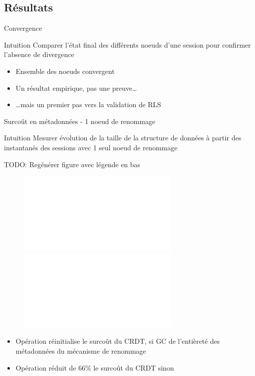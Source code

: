 \subsection{Résultats}

\begin{frame}{Convergence}
  \begin{block}{Intuition}
    Comparer l'état final des différents noeuds d'une session pour confirmer l'absence de divergence
  \end{block}
  \begin{itemize}
    \item Ensemble des noeuds convergent
    \item Un résultat empirique, pas une preuve\dots
    \item \dots mais un premier pas vers la validation de RLS
  \end{itemize}
\end{frame}

\begin{frame}{Surcoût en métadonnées - 1 noeud de renommage}
    \begin{block}{Intuition}
      Mesurer évolution de la taille de la structure de données à partir des instantanés des sessions avec \alert{1 seul noeud de renommage}
    \end{block}
    TODO: Regénérer figure avec légende en bas
    \begin{figure}
      \centering
      \includegraphics<2>[width=0.7\textwidth]{img/snapshots-sizes-2.pdf}
      \includegraphics<3>[width=0.7\textwidth]{img/snapshots-sizes.pdf}
    \end{figure}
    \begin{itemize}
      \item<2-> Opération \ren réinitialise le surcoût du CRDT, si GC de l'entièreté des métadonnées du mécanisme de renommage
      \item<3> Opération \ren réduit de 66\% le surcoût du CRDT sinon
    \end{itemize}
  \end{frame}

